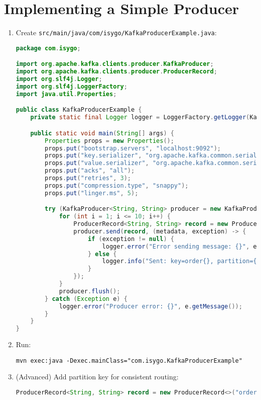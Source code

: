 \documentclass[12pt,a4paper]{report}
\begin{document}
\section{Implementing a Simple Producer}
\begin{enumerate}
    \item Create \texttt{src/main/java/com/isygo/KafkaProducerExample.java}:
\begin{lstlisting}[language=java]
package com.isygo;

import org.apache.kafka.clients.producer.KafkaProducer;
import org.apache.kafka.clients.producer.ProducerRecord;
import org.slf4j.Logger;
import org.slf4j.LoggerFactory;
import java.util.Properties;

public class KafkaProducerExample {
    private static final Logger logger = LoggerFactory.getLogger(KafkaProducerExample.class);

    public static void main(String[] args) {
        Properties props = new Properties();
        props.put("bootstrap.servers", "localhost:9092");
        props.put("key.serializer", "org.apache.kafka.common.serialization.StringSerializer");
        props.put("value.serializer", "org.apache.kafka.common.serialization.StringSerializer");
        props.put("acks", "all");
        props.put("retries", 3);
        props.put("compression.type", "snappy");
        props.put("linger.ms", 5);

        try (KafkaProducer<String, String> producer = new KafkaProducer<>(props)) {
            for (int i = 1; i <= 10; i++) {
                ProducerRecord<String, String> record = new ProducerRecord<>("orders", "order" + i, "Order data " + i);
                producer.send(record, (metadata, exception) -> {
                    if (exception != null) {
                        logger.error("Error sending message: {}", exception.getMessage());
                    } else {
                        logger.info("Sent: key=order{}, partition={}, offset={}", i, metadata.partition(), metadata.offset());
                    }
                });
            }
            producer.flush();
        } catch (Exception e) {
            logger.error("Producer error: {}", e.getMessage());
        }
    }
}
\end{lstlisting}
    \item Run:
    \begin{lstlisting}
mvn exec:java -Dexec.mainClass="com.isygo.KafkaProducerExample"
    \end{lstlisting}
    \item (Advanced) Add partition key for consistent routing:
    \begin{lstlisting}[language=java]
ProducerRecord<String, String> record = new ProducerRecord<>("orders", "customer1", "Order data " + i);
\end{lstlisting}
\end{enumerate}
\end{document}
